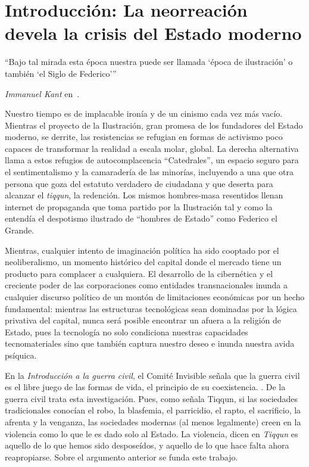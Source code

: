 \chapter{Introducción: La neorreación devela la crisis del Estado moderno}
\label{cha:la-neorreación-devela-la-crisis-del-estado-moderno}

\epigraph{\enquote{Bajo tal mirada esta época nuestra puede ser llamada \enquote{época de ilustración} o también \enquote{el Siglo de Federico}}}{\emph{Immanuel Kant} en~\autocite[p.~11]{kantQueEsIlustracion2009}.}

Nuestro tiempo es de implacable ironía y de un cinismo cada vez más vacío. Mientras el proyecto de la Ilustración, gran promesa de los fundadores del Estado moderno, se derrite, las resistencias se refugian en formas de activismo poco capaces de transformar la realidad a escala molar, global. La derecha alternativa llama a estos refugios de autocomplacencia \enquote{Catedrales}, un espacio seguro para el sentimentalismo y la camaradería de las minorías, incluyendo a una que otra persona que goza del estatuto verdadero de ciudadana y que deserta para alcanzar el \emph{tiqqun}, la redención. Los mismos hombres-masa resentidos llenan internet de propaganda que toma partido por la Ilustración tal y como la entendía el despotismo ilustrado de \enquote{hombres de Estado} como Federico el Grande.

Mientras, cualquier intento de imaginación política ha sido cooptado por el neoliberalismo, un momento histórico del capital donde el mercado tiene un producto para complacer a cualquiera. El desarrollo de la cibernética y el creciente poder de las corporaciones como entidades transnacionales inunda a cualquier discurso político de un montón de limitaciones económicas por un hecho fundamental: mientras las estructuras tecnológicas sean dominadas por la lógica privativa del capital, nunca será posible encontrar un afuera a la religión de Estado, pues la tecnología no solo condiciona nuestras capacidades tecnomateriales sino que también captura nuestro deseo e inunda nuestra avida psíquica.

En la \emph{Introducción a la guerra civil}, el Comité Invisible señala que la guerra civil es el libre juego de las formas de vida, el principio de su coexistencia. \autocite[pág. 17]{tiqqunIntroduccionGuerraCivil2008}. De la guerra civil trata esta investigación. Pues, como señala Tiqqun, si las sociedades tradicionales conocían el robo, la blasfemia, el parricidio, el rapto, el sacrificio, la afrenta y la venganza, las sociedades modernas (al menos legalmente) creen en la violencia como lo que le es dado solo al Estado. La violencia, dicen en \emph{Tiqqun} es aquello de lo que hemos sido desposeídos, y aquello de lo que hace falta ahora reapropiarse. Sobre el argumento anterior se funda este trabajo.


